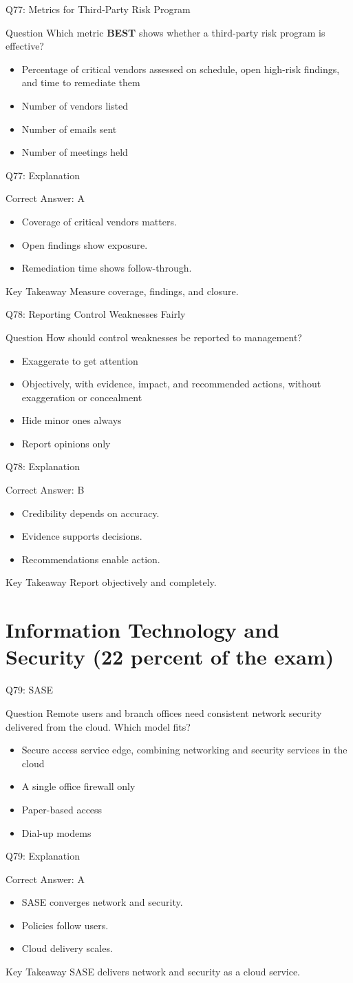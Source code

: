 \documentclass[aspectratio=169]{beamer}
\newcommand{\hq}[7]{%
	\begin{frame}{Q#1: #2}
		\begin{block}{Question}
			#3
		\end{block}
		\begin{itemize}
			#4
		\end{itemize}
	\end{frame}
	\begin{frame}{Q#1: Explanation}
		\begin{block}{Correct Answer: #5}
			\begin{itemize}
				#6
			\end{itemize}
		\end{block}
		\begin{alertblock}{Key Takeaway}
			#7
		\end{alertblock}
	\end{frame}
}
\begin{document}
	\hq{77}{Metrics for Third-Party Risk Program}
	{Which metric \textbf{BEST} shows whether a third-party risk program is effective?}
	{\item[\textbf{(A)}] Percentage of critical vendors assessed on schedule, open high-risk findings, and time to remediate them
		\item[\textbf{(B)}] Number of vendors listed
		\item[\textbf{(C)}] Number of emails sent
		\item[\textbf{(D)}] Number of meetings held}
	{A}
	{\item Coverage of critical vendors matters.
		\item Open findings show exposure.
		\item Remediation time shows follow-through.}
	{Measure coverage, findings, and closure.}

	\hq{78}{Reporting Control Weaknesses Fairly}
	{How should control weaknesses be reported to management?}
	{\item[\textbf{(A)}] Exaggerate to get attention
		\item[\textbf{(B)}] Objectively, with evidence, impact, and recommended actions, without exaggeration or concealment
		\item[\textbf{(C)}] Hide minor ones always
		\item[\textbf{(D)}] Report opinions only}
	{B}
	{\item Credibility depends on accuracy.
		\item Evidence supports decisions.
		\item Recommendations enable action.}
	{Report objectively and completely.}

	\section{Information Technology and Security (22 percent of the exam)}

	\hq{79}{SASE}
	{Remote users and branch offices need consistent network security delivered from the cloud. Which model fits?}
	{\item[\textbf{(A)}] Secure access service edge, combining networking and security services in the cloud
		\item[\textbf{(B)}] A single office firewall only
		\item[\textbf{(C)}] Paper-based access
		\item[\textbf{(D)}] Dial-up modems}
	{A}
	{\item SASE converges network and security.
		\item Policies follow users.
		\item Cloud delivery scales.}
	{SASE delivers network and security as a cloud service.}
\end{document}
